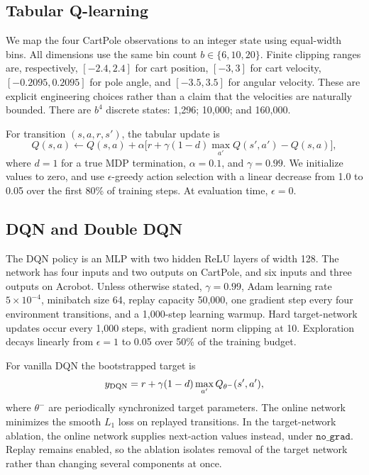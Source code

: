 \documentclass[a4paper,10pt,twocolumn]{article}
\begin{document}
\subsection{Tabular Q-learning}
We map the four CartPole observations to an integer state using equal-width bins. All dimensions use the same bin count $b\in\{6,10,20\}$. Finite clipping ranges are, respectively, $[-2.4,2.4]$ for cart position, $[-3,3]$ for cart velocity, $[-0.2095,0.2095]$ for pole angle, and $[-3.5,3.5]$ for angular velocity. These are explicit engineering choices rather than a claim that the velocities are naturally bounded. There are $b^4$ discrete states: 1,296; 10,000; and 160,000.

For transition $(s,a,r,s')$, the tabular update is
\begin{equation}
Q(s,a) \leftarrow Q(s,a)+\alpha\big[r+\gamma(1-d)\max_{a'}Q(s',a')-Q(s,a)\big],
\label{eq:ql}
\end{equation}
where $d=1$ for a true MDP termination, $\alpha=0.1$, and $\gamma=0.99$. We initialize values to zero, and use $\epsilon$-greedy action selection with a linear decrease from 1.0 to 0.05 over the first 80\% of training steps. At evaluation time, $\epsilon=0$.

\subsection{DQN and Double DQN}
The DQN policy is an MLP with two hidden ReLU layers of width 128. The network has four inputs and two outputs on CartPole, and six inputs and three outputs on Acrobot. Unless otherwise stated, $\gamma=0.99$, Adam learning rate $5\times10^{-4}$, minibatch size 64, replay capacity 50,000, one gradient step every four environment transitions, and a 1,000-step learning warmup. Hard target-network updates occur every 1,000 steps, with gradient norm clipping at 10. Exploration decays linearly from $\epsilon=1$ to 0.05 over 50\% of the training budget.

For vanilla DQN the bootstrapped target is
\begin{equation}
y_{\rm DQN}=r+\gamma(1-d)\max_{a'}Q_{\theta^-}(s',a'),
\end{equation}
where $\theta^-$ are periodically synchronized target parameters. The online network minimizes the smooth $L_1$ loss on replayed transitions. In the target-network ablation, the online network supplies next-action values instead, under $\texttt{no\_grad}$. Replay remains enabled, so the ablation isolates removal of the target network rather than changing several components at once.
\end{document}
